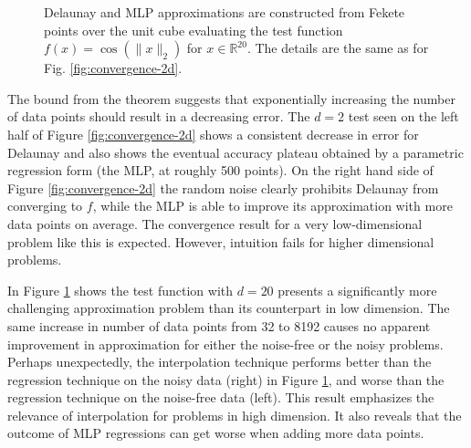 \documentclass[smallextended,final]{svjour3}  %
\begin{document}
\begin{figure}
  \centering
  \caption{Delaunay and MLP approximations are constructed from Fekete
    points over the unit cube evaluating the test function $f(x) =
    \cos(\|x\|_2)$ for $x \in \mathbb{R}^{20}$. The details are the
    same as for Fig. \ref{fig:convergence-2d}.}
  \label{fig:convergence-20d}
\end{figure}


The bound from the theorem suggests that exponentially increasing the
number of data points should result in a decreasing error. The $d = 2$
test seen on the left half of Figure \ref{fig:convergence-2d} shows a
consistent decrease in error for Delaunay and also shows the eventual
accuracy plateau obtained by a parametric regression form (the MLP, at
roughly 500 points). On the right hand side of Figure
\ref{fig:convergence-2d} the random noise clearly prohibits Delaunay
from converging to $f$, while the MLP is able to improve its
approximation with more data points on average.  The convergence
result for a very low-dimensional problem like this is expected.
However, intuition fails for higher dimensional problems.

In Figure \ref{fig:convergence-20d} shows the test function with $d =
20$ presents a significantly more challenging approximation problem
than its counterpart in low dimension. The same increase in number of
data points from 32 to 8192 causes no apparent improvement in
approximation for either the noise-free or the noisy
problems. Perhaps unexpectedly, the interpolation technique performs
better than the regression technique on the noisy data (right) in
Figure \ref{fig:convergence-20d}, and worse than the regression
technique on the noise-free data (left). This result emphasizes the
relevance of interpolation for problems in high dimension. It also
reveals that the outcome of MLP regressions can get worse when adding
more data points.
\end{document}

